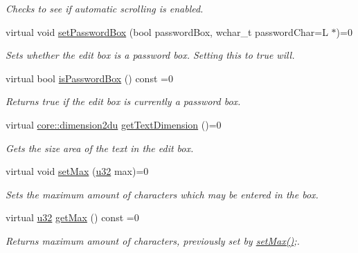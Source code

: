 \begin{DoxyCompactItemize}
\begin{DoxyCompactList}\small\item\em Checks to see if automatic scrolling is enabled. \end{DoxyCompactList}\item 
virtual void \hyperlink{classirr_1_1gui_1_1IGUIEditBox_a755baeca9941267fe11b0c0598b772bf}{set\+Password\+Box} (bool password\+Box, wchar\+\_\+t password\+Char=L\textquotesingle{} $\ast$\textquotesingle{})=0
\begin{DoxyCompactList}\small\item\em Sets whether the edit box is a password box. Setting this to true will. \end{DoxyCompactList}\item 
\mbox{\label{classirr_1_1gui_1_1IGUIEditBox_a94b093df77af7cf3e3f9853d68d2c8f2}} 
virtual bool \hyperlink{classirr_1_1gui_1_1IGUIEditBox_a94b093df77af7cf3e3f9853d68d2c8f2}{is\+Password\+Box} () const =0
\begin{DoxyCompactList}\small\item\em Returns true if the edit box is currently a password box. \end{DoxyCompactList}\item 
virtual \hyperlink{namespaceirr_1_1core_a13e5bd7e47b2014eefc870ede11bbbbc}{core\+::dimension2du} \hyperlink{classirr_1_1gui_1_1IGUIEditBox_ac993c4647168460c68d56527ba213b9c}{get\+Text\+Dimension} ()=0
\begin{DoxyCompactList}\small\item\em Gets the size area of the text in the edit box. \end{DoxyCompactList}\item 
virtual void \hyperlink{classirr_1_1gui_1_1IGUIEditBox_a5253ed6b422e129356e56f8e2a610be5}{set\+Max} (\hyperlink{namespaceirr_a0416a53257075833e7002efd0a18e804}{u32} max)=0
\begin{DoxyCompactList}\small\item\em Sets the maximum amount of characters which may be entered in the box. \end{DoxyCompactList}\item 
\mbox{\label{classirr_1_1gui_1_1IGUIEditBox_ad402bf1211f1a41bf230cc587060648e}} 
virtual \hyperlink{namespaceirr_a0416a53257075833e7002efd0a18e804}{u32} \hyperlink{classirr_1_1gui_1_1IGUIEditBox_ad402bf1211f1a41bf230cc587060648e}{get\+Max} () const =0
\begin{DoxyCompactList}\small\item\em Returns maximum amount of characters, previously set by \hyperlink{classirr_1_1gui_1_1IGUIEditBox_a5253ed6b422e129356e56f8e2a610be5}{set\+Max()};. \end{DoxyCompactList}\end{DoxyCompactItemize}
